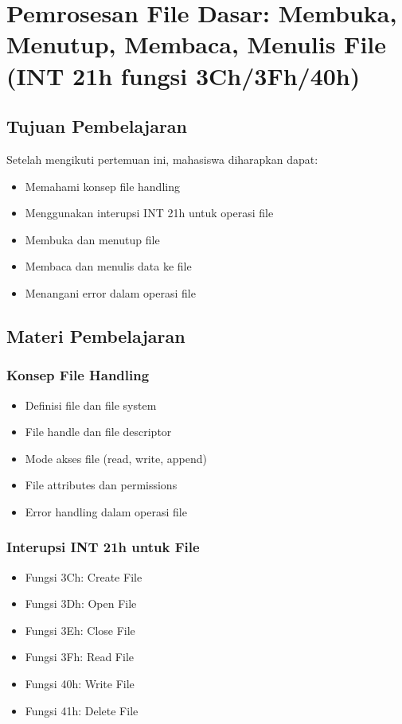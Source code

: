 \chapter{Pemrosesan File Dasar: Membuka, Menutup, Membaca, Menulis File (INT 21h fungsi 3Ch/3Fh/40h)}

\section{Tujuan Pembelajaran}
Setelah mengikuti pertemuan ini, mahasiswa diharapkan dapat:
\begin{itemize}
\item Memahami konsep file handling
\item Menggunakan interupsi INT 21h untuk operasi file
\item Membuka dan menutup file
\item Membaca dan menulis data ke file
\item Menangani error dalam operasi file
\end{itemize}

\section{Materi Pembelajaran}

\subsection{Konsep File Handling}
\begin{itemize}
\item Definisi file dan file system
\item File handle dan file descriptor
\item Mode akses file (read, write, append)
\item File attributes dan permissions
\item Error handling dalam operasi file
\end{itemize}

\subsection{Interupsi INT 21h untuk File}
\begin{itemize}
\item Fungsi 3Ch: Create File
\item Fungsi 3Dh: Open File
\item Fungsi 3Eh: Close File
\item Fungsi 3Fh: Read File
\item Fungsi 40h: Write File
\item Fungsi 41h: Delete File
\end{itemize}


